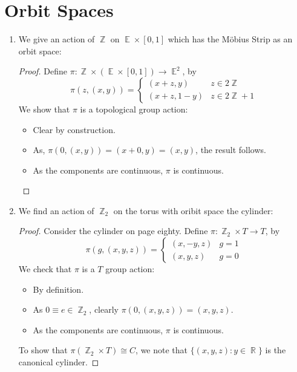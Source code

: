 \documentclass{book}
\DeclareMathOperator*{\R}{\mathbb{R}}
\DeclareMathOperator*{\E}{\mathbb{E}}
\DeclareMathOperator*{\Z}{\mathbb{Z}}
\begin{document}
\section{Orbit Spaces}
\begin{enumerate}[(1)]
    \item We give an action of $\Z$ on $\E \times [0,1]$ which has the M\"obius Strip as an orbit space: 
        \begin{proof} Define $\pi : \Z \times (\E \times [0,1]) \rightarrow \E^2$, by
            \[ \pi (z, (x,y)) = 
            \begin{cases}
                (x+z,y) & z \in 2\Z \\
                (x+z, 1-y) & z \in 2\Z +1
            \end{cases}
            \]
            We show that $\pi$ is a topological group action:  
            \begin{itemize}
                \item Clear by construction.
                \item As, $\pi(0,(x,y)) = (x + 0, y) = (x,y)$, the result follows. 
                \item As the components are continuous, $\pi$ is continuous. 
            \end{itemize}
        \end{proof}

    \item  We find an action of $\Z_2$ on the torus with oribit space the cylinder: 
        \begin{proof} Consider the cylinder on page eighty. Define $\pi : \Z_2 \times T \rightarrow T$, by 
            \[\pi(g, (x,y,z)) = 
            \begin{cases}
                (x, -y , z) & g = 1 \\
                (x, y, z) & g = 0 
            \end{cases}
            \]
            We check that $\pi$ is a $T$ group action: 
            \begin{itemize}
                \item By definition. 
                \item As $ 0 \equiv e \in \Z_2$, clearly $\pi (0 ,(x,y,z))  = (x, y, z)$. 
                \item As the components are continuous, $\pi$ is continuous.
            \end{itemize}
            To show that $\pi(\Z_2 \times T) \cong C$, we note that $\{(x,y,z) : y \in \R\}$ is the canonical cylinder.
        \end{proof}


\end{enumerate}
\end{document}

